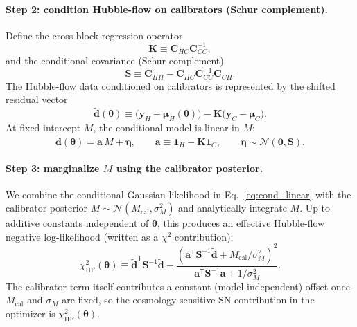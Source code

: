 \documentclass[10pt]{article}
\begin{document}
\paragraph{Step 2: condition Hubble-flow on calibrators (Schur complement).}
Define the cross-block regression operator
\begin{equation}
\bm{K}\equiv \bm{C}_{HC}\bm{C}_{CC}^{-1},
\end{equation}
and the conditional covariance (Schur complement)
\begin{equation}
\bm{S}\equiv \bm{C}_{HH}-\bm{C}_{HC}\bm{C}_{CC}^{-1}\bm{C}_{CH}.
\label{eq:schur}
\end{equation}
The Hubble-flow data conditioned on calibrators is represented by the shifted residual vector
\begin{equation}
\tilde{\bm{d}}(\bm{\theta}) \equiv
\bigl(\bm{y}_H-\bm{\mu}_H(\bm{\theta})\bigr)
-\bm{K}\bigl(\bm{y}_C-\bm{\mu}_C\bigr).
\label{eq:dtilde}
\end{equation}
At fixed intercept $M$, the conditional model is linear in $M$:
\begin{equation}
\tilde{\bm{d}}(\bm{\theta}) = \bm{a}\,M + \bm{\eta},
\qquad
\bm{a}\equiv \bm{1}_H-\bm{K}\bm{1}_C,
\qquad
\bm{\eta}\sim \mathcal{N}(\bm{0},\bm{S}).
\label{eq:cond_linear}
\end{equation}

\paragraph{Step 3: marginalize $M$ using the calibrator posterior.}
We combine the conditional Gaussian likelihood in Eq.~\eqref{eq:cond_linear} with the calibrator posterior $M\sim\mathcal{N}(M_{\mathrm{cal}},\sigma_M^2)$ and analytically integrate $M$.
Up to additive constants independent of $\bm{\theta}$, this produces an effective Hubble-flow negative log-likelihood (written as a $\chi^2$ contribution):
\begin{equation}
\chi^2_{\mathrm{HF}}(\bm{\theta}) \equiv
\tilde{\bm{d}}^{\mathsf{T}}\bm{S}^{-1}\tilde{\bm{d}}
-\frac{\left(\bm{a}^{\mathsf{T}}\bm{S}^{-1}\tilde{\bm{d}} + M_{\mathrm{cal}}/\sigma_M^2\right)^2}
{\bm{a}^{\mathsf{T}}\bm{S}^{-1}\bm{a} + 1/\sigma_M^2}.
\label{eq:chi2_hf}
\end{equation}
The calibrator term itself contributes a constant (model-independent) offset once $M_{\mathrm{cal}}$ and $\sigma_M$ are fixed, so the cosmology-sensitive SN contribution in the optimizer is $\chi^2_{\mathrm{HF}}(\bm{\theta})$.
\end{document}
